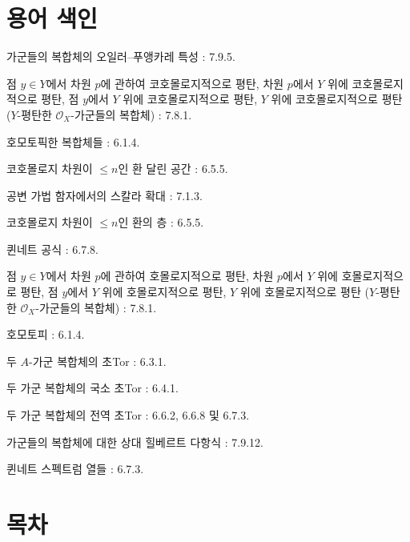 \section*{용어 색인}

\begin{flushleft}
가군들의 복합체의 오일러--푸앵카레 특성 : 7.9.5.

\medskip
점 $y\in Y$에서 차원 $p$에 관하여 코호몰로지적으로 평탄,
차원 $p$에서 $Y$ 위에 코호몰로지적으로 평탄, 점 $y$에서 $Y$ 위에
코호몰로지적으로 평탄, $Y$ 위에 코호몰로지적으로 평탄
($Y$-평탄한 $\mathscr O_X$-가군들의 복합체) : 7.8.1.

\medskip
호모토픽한 복합체들 : 6.1.4.

\medskip
코호몰로지 차원이 $\leq n$인 환 달린 공간 : 6.5.5.

\medskip
공변 가법 함자에서의 스칼라 확대 : 7.1.3.

\medskip
코호몰로지 차원이 $\leq n$인 환의 층 : 6.5.5.

\medskip
퀸네트 공식 : 6.7.8.

\medskip
점 $y\in Y$에서 차원 $p$에 관하여 호몰로지적으로 평탄,
차원 $p$에서 $Y$ 위에 호몰로지적으로 평탄, 점 $y$에서 $Y$ 위에
호몰로지적으로 평탄, $Y$ 위에 호몰로지적으로 평탄
($Y$-평탄한 $\mathscr O_X$-가군들의 복합체) : 7.8.1.

\medskip
호모토피 : 6.1.4.

\medskip
두 $A$-가군 복합체의 초Tor : 6.3.1.

\medskip
두 가군 복합체의 국소 초Tor : 6.4.1.

\medskip
두 가군 복합체의 전역 초Tor : 6.6.2, 6.6.8 및 6.7.3.

\medskip
가군들의 복합체에 대한 상대 힐베르트 다항식 : 7.9.12.

\medskip
퀸네트 스펙트럼 열들 : 6.7.3.
\end{flushleft}


\clearpage
{}
\section*{목차}

